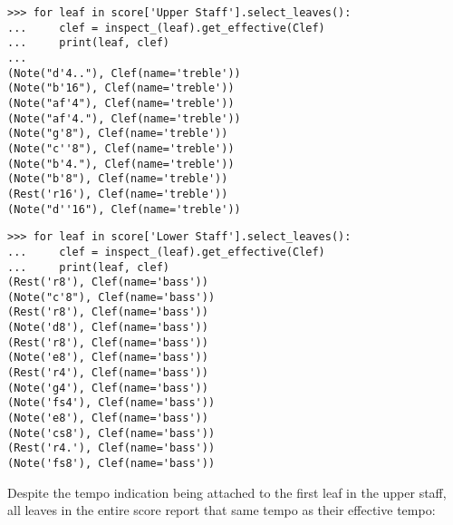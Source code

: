 \begin{abjadbookoutput}
\begin{singlespacing}
\vspace{-0.5\baselineskip}
\begin{lstlisting}
>>> for leaf in score['Upper Staff'].select_leaves():
...     clef = inspect_(leaf).get_effective(Clef)
...     print(leaf, clef)
...
(Note("d'4.."), Clef(name='treble'))
(Note("b'16"), Clef(name='treble'))
(Note("af'4"), Clef(name='treble'))
(Note("af'4."), Clef(name='treble'))
(Note("g'8"), Clef(name='treble'))
(Note("c''8"), Clef(name='treble'))
(Note("b'4."), Clef(name='treble'))
(Note("b'8"), Clef(name='treble'))
(Rest('r16'), Clef(name='treble'))
(Note("d''16"), Clef(name='treble'))
\end{lstlisting}
\begin{lstlisting}
>>> for leaf in score['Lower Staff'].select_leaves():
...     clef = inspect_(leaf).get_effective(Clef)
...     print(leaf, clef)
(Rest('r8'), Clef(name='bass'))
(Note("c'8"), Clef(name='bass'))
(Rest('r8'), Clef(name='bass'))
(Note('d8'), Clef(name='bass'))
(Rest('r8'), Clef(name='bass'))
(Note('e8'), Clef(name='bass'))
(Rest('r4'), Clef(name='bass'))
(Note('g4'), Clef(name='bass'))
(Note('fs4'), Clef(name='bass'))
(Note('e8'), Clef(name='bass'))
(Note('cs8'), Clef(name='bass'))
(Rest('r4.'), Clef(name='bass'))
(Note('fs8'), Clef(name='bass'))
\end{lstlisting}
\end{singlespacing}
\end{abjadbookoutput}

\noindent Despite the tempo indication being attached to the first leaf in the
upper staff, all leaves in the entire score report that same tempo as their
effective tempo:

\begin{comment}
<abjad>
for leaf in score['Upper Staff'].select_leaves():
    tempo = inspect_(leaf).get_effective(Tempo)
    print(leaf, tempo)

for leaf in score['Lower Staff'].select_leaves():
    tempo = inspect_(leaf).get_effective(Tempo)
    print(leaf, tempo)

</abjad>
\end{comment}

